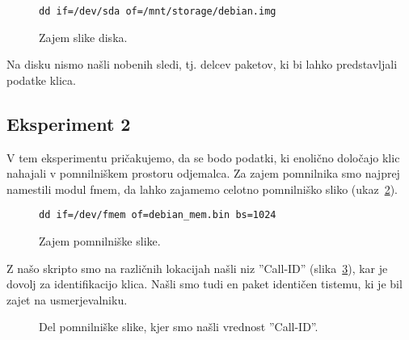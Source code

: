 \documentclass{acm_proc_article-sp}
\begin{document}
\begin{figure}
\centering
\begin{verbatim}
dd if=/dev/sda of=/mnt/storage/debian.img
\end{verbatim}
\caption{Zajem slike diska.}
\label{fig:dd}
\end{figure}

Na disku nismo našli nobenih sledi, tj. delcev paketov, ki bi lahko predstavljali podatke klica.

\subsection{Eksperiment 2}

V tem eksperimentu pričakujemo, da se bodo podatki, ki enolično določajo klic nahajali v pomnilniškem prostoru odjemalca. Za zajem pomnilnika smo najprej namestili modul fmem, da lahko zajamemo celotno pomnilniško sliko (ukaz~\ref{fig:fmem}).

\begin{figure}
\centering
\begin{verbatim}
dd if=/dev/fmem of=debian_mem.bin bs=1024
\end{verbatim}
\caption{Zajem pomnilniške slike.}
\label{fig:fmem}
\end{figure}

Z našo skripto smo na različnih lokacijah našli niz ''Call-ID'' (slika~\ref{fig:eks2}), kar je dovolj za identifikacijo klica. Našli smo tudi en paket identičen tistemu, ki je bil zajet na usmerjevalniku.

\begin{figure}
\centering
{} %
\caption{Del pomnilniške slike, kjer smo našli vrednost ''Call-ID''.}
\label{fig:eks2}
\end{figure}
\end{document}
